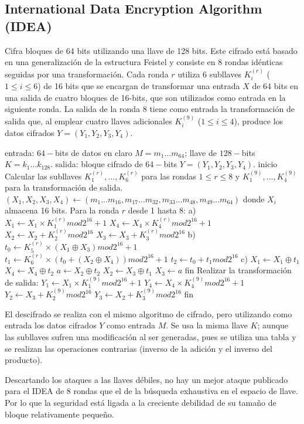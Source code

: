 \subsection{International Data Encryption Algorithm (IDEA)}

Cifra bloques de 64 bits utilizando una llave de 128 bits. Este cifrado
está basado en una generalización de la estructura Feistel y consiste en
8 rondas idénticas seguidas por una transformación. Cada ronda $r$ 
utiliza 6 subllaves $K^{(r)}_i$ ($1 \leq i \leq 6$) de 16 bits que se 
encargan de transformar una entrada $X$ de 64 bits en una salida de 
cuatro bloques de 16-bits, que son utilizados como entrada en la 
siguiente ronda. La salida de la ronda 8 tiene como entrada la 
transformación de salida que, al emplear cuatro llaves adicionales 
$K^{(9)}_i$ ($1 \leq i \leq 4$), produce los datos cifrados 
$Y = (Y_1, Y_2, Y_3, Y_4)$.


\begin{pseudocodigo}[caption={IDEA, cifrado.}, label={idea:1}]
  entrada: $64-$bits de datos en claro $M = m_1 \dots m_64$; llave de $128-$bits $ K = k_1 \dots k_{128}$.
  salida: bloque cifrado de $64-$bits $Y = (Y_1, Y_2, Y_3, Y_4)$.
  inicio
    Calcular las subllaves $K^{(r)}_1, \dots, K^{(r)}_{6}$ para las rondas $1 \leq r \leq 8$ y $K^{(9)}_1, \dots, K^{(9)}_{4}$
    para la transformación de salida.
    $(X_1, X_2, X_3, X_4) \leftarrow (m_1 \dots m_{16}, m_{17} \dots m_{32}, m_{33} \dots m_{48}, m_{49} \dots m_{64})$ donde $X_i$ almacena 16 bits.
    Para la ronda $r$ desde 1 hasta 8:
      a) $X_1 \leftarrow X_1 \times K_1^{(r)} mod 2^{16} + 1$
         $X_4 \leftarrow X_4 \times K_4^{(r)} mod 2^{16} + 1$
         $X_2 \leftarrow X_2 + K_2^{(r)} mod 2^{16}$
         $X_3 \leftarrow X_3 + K_3^{(r)} mod 2^{16}$
      b) $t_0 \leftarrow K_5^{(r)} \times (X_1 \oplus X_3) mod 2^{16} + 1$
         $t_1 \leftarrow K_6^{(r)} \times (t_0 + (X_2 \oplus X_4)) mod 2^{16} + 1$
         $t_2 \leftarrow t_0 + t_1 mod 2^{16}$
      c) $X_1 \leftarrow X_1 \oplus t_1$
         $X_4 \leftarrow X_4 \oplus t_2$
         $a \leftarrow X_2 \oplus t_2$
         $X_2 \leftarrow X_3 \oplus t_1$
         $X_3 \leftarrow a$
    fin
    Realizar la transformación de salida:
      $Y_1 \leftarrow X_1 \times K_1^{(9)} mod 2^{16} + 1$
      $Y_4 \leftarrow X_4 \times K_4^{(9)} mod 2^{16} + 1$
      $Y_2 \leftarrow X_3 + K_2^{(9)} mod 2^{16}$
      $Y_3 \leftarrow X_2 + K_3^{(9)} mod 2^{16}$
  fin
\end{pseudocodigo}

El descifrado se realiza con el mismo algoritmo de cifrado, pero 
utilizando como entrada los datos cifrados $Y$ como entrada $M$. Se usa la
misma llave $K$; aunque las subllaves sufren una modificación al ser
generadas, pues se utiliza una tabla y se realizan las operaciones 
contrarias (inverso de la adición y el inverso del producto).

Descartando los ataques a las llaves débiles, no hay un mejor ataque 
publicado para el IDEA de 8 rondas que el de la búsqueda exhaustiva
en el espacio de llave. Por lo que la seguridad está ligada a la 
creciente debilidad de su tamaño de bloque relativamente pequeño.